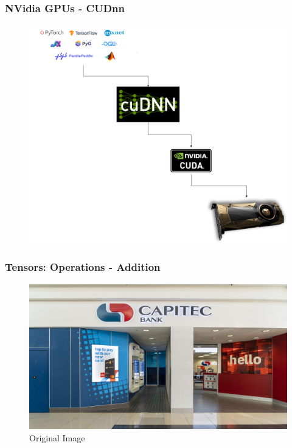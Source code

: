 \documentclass[11pt]{beamer}
\begin{document}
\begin{frame}
	\frametitle{NVidia GPUs - CUDnn}
	\begin{center}
		\begin{figure}
			\includegraphics[width=\textwidth,height=\textheight,keepaspectratio]{DL_Stack_3}
		\end{figure}
	\end{center}
\end{frame}


\begin{frame}
	\frametitle{Tensors: Operations - Addition}
		 \begin{figure}
		\includegraphics[scale=0.17]{"1 - original_image"}
		\caption{Original Image}
	\end{figure}
\end{frame}
\end{document}
